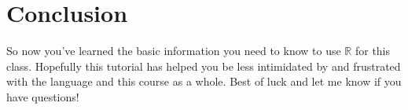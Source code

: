 \documentclass[12pt]{article}
\begin{document}
\section{Conclusion}\label{sec:conclusion}
So now you've learned the basic information you need to know to use $\mathbb{R}$ for this class. Hopefully this tutorial has helped you be less intimidated by and frustrated with the language and this course as a whole. Best of luck and let me know if you have questions!

\singlespacing
%





\end{document}
